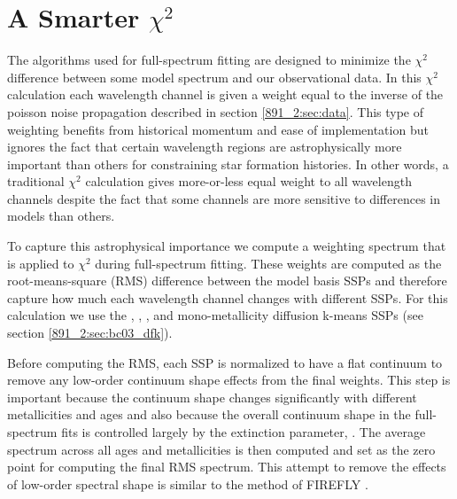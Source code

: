 \section{A Smarter $\chi^2$}
\label{891_2:sec:smart_chi}

The algorithms used for full-spectrum fitting are designed to minimize
the $\chi^2$ difference between some model spectrum and our
observational data. In this $\chi^2$ calculation each wavelength
channel is given a weight equal to the inverse of the poisson noise
propagation described in section \ref{891_2:sec:data}. This type of
weighting benefits from historical momentum and ease of implementation
but ignores the fact that certain wavelength regions are
astrophysically more important than others for constraining star
formation histories. In other words, a traditional $\chi^2$
calculation gives more-or-less equal weight to all wavelength channels
despite the fact that some channels are more sensitive to differences
in models than others.



To capture this astrophysical importance we compute a weighting
spectrum that is applied to $\chi^2$ during full-spectrum
fitting. These weights are computed as the root-means-square (RMS)
difference between the model basis SSPs and therefore capture how much
each wavelength channel changes with different SSPs. For this
calculation we use the , ,
, and  mono-metallicity
 diffusion k-means SSPs (see section
\ref{891_2:sec:bc03_dfk}).


Before computing the RMS, each SSP is normalized to have a flat
continuum to remove any low-order continuum shape effects from the
final weights. This step is important because the continuum shape
changes significantly with different metallicities and ages and also
because the overall continuum shape in the full-spectrum fits is
controlled largely by the extinction parameter, \tauV. The average
spectrum across all ages and metallicities is then computed and set as
the zero point for computing the final RMS spectrum. This attempt to
remove the effects of low-order spectral shape is similar to the
method of FIREFLY \citep{Wilkinson15}.

